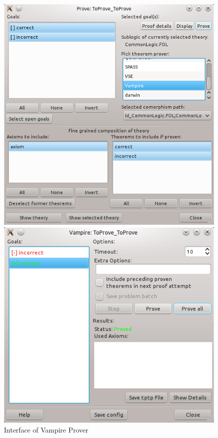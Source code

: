 \documentclass{article}
\newcommand{\normalTEXTSC}[2]{{#1\scriptsize#2}}
\newcommand     {\Hets}{\normalTEXTSC{H}{ETS}\xspace}
\begin{document}
\begin{figure}[ht]
\begin{minipage}[b]{0.5\linewidth}
  \centering
  \includegraphics[width=\linewidth,keepaspectratio=true]{UserGuideCL_Prove_Prove}
  \caption{\Hets Goal and Prover Interface\label{fig:proof_window}}
\end{minipage}
\hspace{0.1\linewidth}
\begin{minipage}[b]{0.5\linewidth}
  \includegraphics[width=\linewidth,keepaspectratio=true]{UserGuideCL_Prove_Vampire}
  \caption{Interface of Vampire Prover\label{fig:Vampire}}
\end{minipage}
\end{figure}
\end{document}
